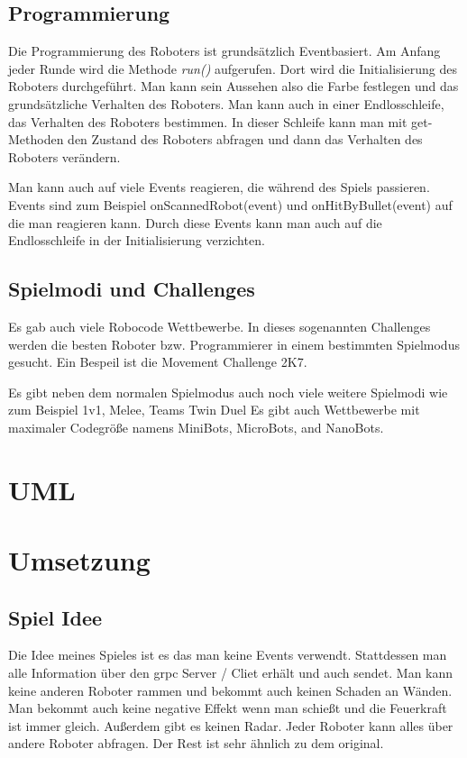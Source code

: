 \documentclass{article}
\begin{document}
\subsection{Programmierung}
Die Programmierung des Roboters ist grundsätzlich Eventbasiert. Am Anfang jeder Runde wird die Methode \textit{run()} aufgerufen. Dort wird die Initialisierung des Roboters durchgeführt. Man kann sein Aussehen also die Farbe festlegen und das grundsätzliche Verhalten des Roboters. Man kann auch in einer Endlosschleife, das Verhalten des Roboters bestimmen. In dieser Schleife kann man mit get-Methoden den Zustand des Roboters abfragen und dann das Verhalten des Roboters verändern.

Man kann auch auf viele Events reagieren, die während des Spiels passieren. Events sind zum Beispiel onScannedRobot(event) und onHitByBullet(event) auf die man reagieren kann. Durch diese Events kann man auch auf die Endlosschleife in der Initialisierung verzichten.

\subsection{Spielmodi und Challenges}
Es gab auch viele Robocode Wettbewerbe. In dieses sogenannten Challenges werden die besten Roboter bzw. Programmierer in einem bestimmten Spielmodus gesucht. Ein Bespeil ist die Movement Challenge 2K7.

Es gibt neben dem normalen Spielmodus auch noch viele weitere Spielmodi wie zum Beispiel 1v1, Melee, Teams Twin Duel Es gibt auch Wettbewerbe mit maximaler Codegröße namens MiniBots, MicroBots, and NanoBots.

\vspace{1.5cm}

\section{UML}




\section{Umsetzung}

\subsection{Spiel Idee}
Die Idee meines Spieles ist es das man keine Events verwendt. Stattdessen man alle Information über den grpc Server / Cliet erhält und auch sendet. Man kann keine anderen Roboter rammen und bekommt auch keinen Schaden an Wänden. Man bekommt auch keine negative Effekt wenn man schießt und die Feuerkraft ist immer gleich. Außerdem gibt es keinen Radar. Jeder Roboter kann alles über andere Roboter abfragen. Der Rest ist sehr ähnlich zu dem original.
\end{document}
